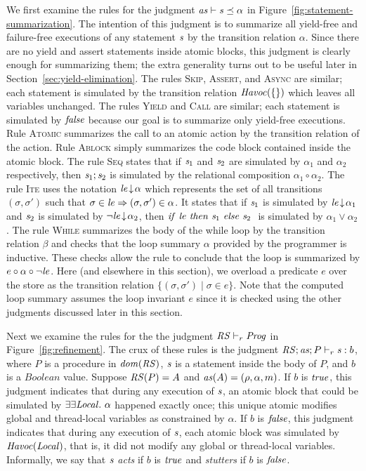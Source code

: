 We first examine the rules for the judgment $\mathit{as} \vdash \mathit{s} \preceq \alpha$ in Figure~\ref{fig:statement-summarization}.
The intention of this judgment is to summarize all yield-free and failure-free executions of any statement $\mathit{s}$ by the transition relation $\alpha$.
Since there are no yield and assert statements inside atomic blocks, this judgment is clearly enough for summarizing them;
the extra generality turns out to be useful later in Section~\ref{sec:yield-elimination}.
The rules \textsc{Skip}, \textsc{Assert}, and \textsc{Async} are similar;
each statement is simulated by the transition relation $\mathit{Havoc}(\{\})$ which leaves all variables unchanged.
The rules \textsc{Yield} and \textsc{Call} are similar;
each statement is simulated by $\mathit{false}$ because our goal is to summarize only yield-free executions.
Rule \textsc{Atomic} summarizes the call to an atomic action by the transition relation of the action.
Rule \textsc{Ablock} simply summarizes the code block contained inside the atomic block.
The rule \textsc{Seq} states that if $\mathit{s}_1$ and $\mathit{s}_2$ are simulated by $\alpha_1$ and $\alpha_2$ respectively, 
then $\mathit{s}_1;\mathit{s}_2$ is simulated by the relational composition $\alpha_1 \circ \alpha_2$.
The rule \textsc{Ite} uses the notation ${\mathit{le}}\!\downarrow\!{\alpha}$ which represents the set of all transitions $(\sigma, \sigma')$ 
such that $\sigma \in \mathit{le} \Rightarrow (\sigma,\sigma') \in \alpha$.
It states that if $\mathit{s}_1$ is simulated by ${\mathit{le}}\!\downarrow\!{\alpha_1}$ and $\mathit{s}_2$ is simulated by ${\neg \mathit{le}}\!\downarrow\!{\alpha_2}$,
then ${\mathit{if}\ {\mathit{le}}\ }{\mathit{then}\ {\mathit{s}_1}\ }{\mathit{else}\ {\mathit{s}_2}\ }$ is simulated by $\alpha_1 \vee \alpha_2$.
The rule \textsc{While} summarizes the body of the while loop by the transition relation $\beta$ and checks that the 
loop summary $\alpha$ provided by the programmer is inductive.
These checks allow the rule to conclude that the loop is summarized by $e \circ \alpha \circ \neg \mathit{le}$.
Here (and elsewhere in this section), we overload a predicate $e$ over the store as the transition relation $\{(\sigma,\sigma') \mid \sigma \in e\}$.
Note that the computed loop summary assumes the loop invariant $e$ since it is checked using the other judgments discussed later in this section.

Next we examine the rules for the the judgment $\mathit{RS} \vdash_r \mathit{Prog}$ in Figure~\ref{fig:refinement}.
The crux of these rules is the judgment $\mathit{RS};\mathit{as};P \vdash_r \mathit{s} : b$, 
where $P$ is a procedure in $\mathit{dom}(\mathit{RS})$, $\mathit{s}$ is a statement inside the body of $P$, and $b$ is a 
$\mathit{Boolean}$ value.
Suppose $\mathit{RS}(P) = A$ and $\mathit{as}(A) = (\rho, \alpha, m)$.
If $b$ is $\mathit{true}$, this judgment indicates that during any execution of $\mathit{s}$, 
an atomic block that could be simulated by $\exists\exists {\mathit{Local}}.\ \alpha$ happened exactly once;
this unique atomic modifies global and thread-local variables as constrained by $\alpha$.
If $b$ is $\mathit{false}$, this judgment indicates that during any execution of $\mathit{s}$, each atomic block
was simulated by $\mathit{Havoc}(\mathit{Local})$, that is, it did not modify any global or thread-local variables.
Informally, we say that $\mathit{s}$ {\em acts\/} if $b$ is $\mathit{true}$ and {\em stutters\/} if $b$ is $\mathit{false}$.

